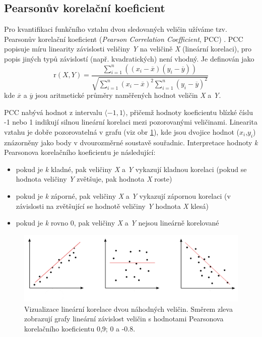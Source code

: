 \subsection{Pearsonův korelační koeficient}
Pro kvantifikaci funkčního vztahu dvou sledovaných veličin užíváme tzv. Pearsonův korelační koeficient (\textit{Pearson Correlation Coefficient}, PCC) \cite{PCC}. PCC popisuje míru linearity závislosti veličiny \textit{Y} na veličině \textit{X} (lineární korelaci), pro popis jiných typů závislostí (např. kvadratických) není vhodný. Je definován jako
\begin{equation}
\label{pearson}
    \text{r}(X,Y) = \frac
    {\sum_{i=1}^n ((x_i - \overline{x})(y_i - \overline{y}))}
    {\sqrt{\sum_{i=1}^n (x_i - \overline{x})^2 \sum_{i=1}^n (y_i - \overline{y})^2}}
\end{equation}
kde $\overline{x}$ a $\overline{y}$ jsou aritmetické průměry naměřených hodnot veličin \textit{X} a \textit{Y}. 

PCC nabývá hodnot z intervalu $\langle-1, 1 \rangle$, přičemž hodnoty koeficientu blízké číslu -1 nebo 1 indikují silnou lineární korelaci mezi pozorovanými veličinami. Linearita vztahu je dobře pozorovatelná v grafu (viz obr \ref{PCC_obr}), kde jsou dvojice hodnot ($x_i$,$y_i$) znázorněny jako body v dvourozměrné soustavě souřadnic. Interpretace hodnoty \textit{k} Pearsonova korelačního koeficientu je následující: 
\begin{itemize}
    \item pokud je \textit{k} kladné, pak veličiny \textit{X} a \textit{Y} vykazují kladnou korelaci (pokud se hodnota veličiny \textit{Y} zvětšuje, pak hodnota\textit{ X} roste)
    \item pokud je \textit{k} záporné, pak veličiny \textit{X} a \textit{Y} vykazují zápornou korelaci (v závislosti na zvětšující se hodnotě veličiny \textit{Y} hodnota \textit{X} klesá)
    \item pokud je \textit{k} rovno 0, pak veličiny \textit{X} a \textit{Y} nejsou lineárně korelované
\end{itemize}

\begin{figure}[h]
\begin{center}
\includegraphics[width=12cm]{pictures/pearson_lines.png}
\caption{Vizualizace lineární korelace dvou náhodných veličin. Směrem zleva zobrazují grafy lineární závislost veličin s hodnotami Pearsonova korelačního koeficientu 0,9; 0 a -0.8.}
\label{PCC_obr}
\end{center}
\end{figure}


